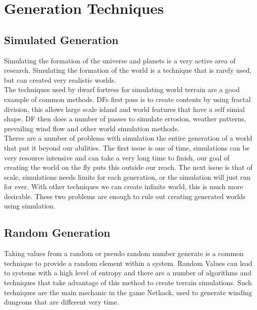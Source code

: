 \newpage

\section{Generation Techniques}

\subsection{Simulated Generation}
Simulating the formation of the universe and planets is a very active area of 
research. Simulating the formation of the world is a technique that is rarely
used, but can created very realistic worlds.\\

The techniques used by dwarf fortress for simulating world terrain are a good
example of common methods. DFs first pass is to create contents by using fractal
division, this allows large scale island and world features that have a self 
simial shape. DF then does a number of passes to simulate errosion, weather 
patterns, prevailing wind flow and other world simulation methods.\\

Theres are a number of problems with
simulation the entire generation of a world that put it beyond our abilities. 
The first issue is one of time, simulations can be very resource intensive and 
can take a very long time to finish, our goal of creating the world on the fly 
puts this outside our reach. The next issue is that of scale, simulations needs
limits for each generation, or the simulation will just run for ever. With other
techniques we can create infinite world, this is much more desirable. These two
problems are enough to rule out creating generated worlds using simulation.\\

\subsection{Random Generation}
Taking values from a random or pseudo random number generate is a common 
technique to provide a random element within a system. Random Values can lead to
systems with a high level of entropy and there are a number of algorithms and 
techniques that take advantage of this method to create terrain simulations. Such
techniques are the main mechanic in the game Nethack, used to generate winding
dungeons that are different very time.\\

